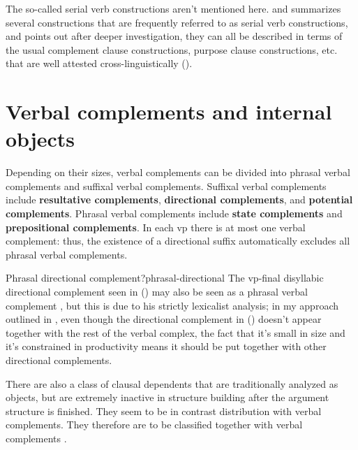 \documentclass[UTF8, a4paper, oneside, scheme=plain]{ctexrep}
\newcommand*{\citesec}[1]{\S~{#1}}
\newcommand*{\citepage}[1]{p.~{#1}}
\newcommand*{\citepages}[1]{pp.~{#1}}
\newcommand*{\concept}[1]{\textbf{#1}}
\begin{document}
The so-called serial verb constructions aren't mentioned here.
\citet{paul2008serial} and \citet[\citesec{9.4}]{deng2010formal} 
summarizes several constructions that are
frequently referred to as serial verb constructions,
and points out after deeper investigation,
they can all be described in terms of the usual complement clause constructions,
purpose clause constructions, etc. 
that are well attested cross-linguistically ().


\section{Verbal complements and internal objects}\label{sec:verbal-complement}

Depending on their sizes, 
verbal complements can be divided into 
phrasal verbal complements 
and suffixal verbal complements. 
Suffixal verbal complements 
include \concept{resultative complements}, 
\concept{directional complements}, 
and \concept{potential complements}. 
Phrasal verbal complements include \concept{state complements} and 
\concept{prepositional complements}.
In each \acs{vp} there is at most one verbal complement: 
thus, the existence of a directional suffix
automatically excludes all phrasal verbal complements.

\begin{infobox}{Phrasal directional complement?}{phrasal-directional}
    The \acs{vp}-final disyllabic directional complement seen in 
    ()
    may also be seen as a phrasal verbal complement 
    \citep[\citepage{120}]{deng2010formal}, 
    but this is due to his strictly lexicalist analysis; 
    in my approach outlined in , 
    even though the directional complement in  
    ()
    doesn't appear together with the rest of the verbal complex, 
    the fact that it's small in size and  
    it's constrained in productivity
    means it should be put together with other directional complements. 
\end{infobox}

There are also a class of clausal dependents 
that are traditionally analyzed as objects,
but are extremely inactive in structure building 
after the argument structure is finished.
They seem to be in contrast distribution with verbal complements.
They therefore are to be classified together with verbal complements
\citep[\citepages{188-190}]{deng2010formal}.
\end{document}

